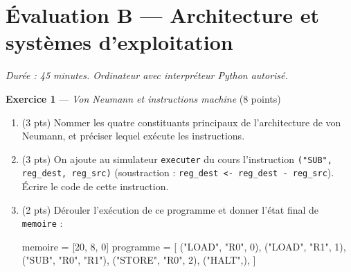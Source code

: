 \section*{Évaluation B --- Architecture et systèmes d'exploitation}
\textit{Durée : 45 minutes. Ordinateur avec interpréteur Python autorisé.}


\bigskip

\textbf{Exercice 1} --- \textit{Von Neumann et instructions machine} \hfill (8 points)

\begin{enumerate}
  \item (3 pts) Nommer les quatre constituants principaux de l'architecture de von Neumann, et préciser lequel exécute les instructions.
  \item (3 pts) On ajoute au simulateur \lstinline{executer} du cours l'instruction \lstinline{("SUB", reg_dest, reg_src)} (soustraction : \lstinline{reg_dest <- reg_dest - reg_src}). Écrire le code de cette instruction.
  \item (2 pts) Dérouler l'exécution de ce programme et donner l'état final de \lstinline{memoire} :
\begin{python}
memoire = [20, 8, 0]
programme = [
    ("LOAD", "R0", 0),
    ("LOAD", "R1", 1),
    ("SUB", "R0", "R1"),
    ("STORE", "R0", 2),
    ("HALT",),
]
\end{python}
\end{enumerate}


